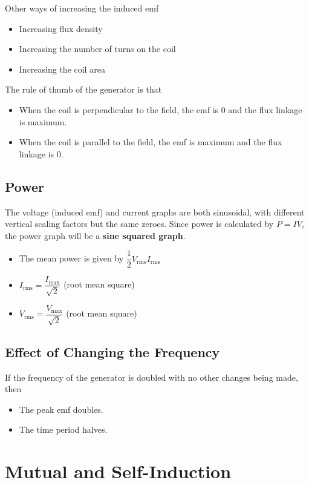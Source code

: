 \documentclass[a4paper,12pt]{article}
\let\oldsection\section
\renewcommand\section{\clearpage\oldsection}
\begin{document}
Other ways of increasing the induced emf
\begin{itemize}
  \item Increasing flux density
  \item Increasing the number of turns on the coil
  \item Increasing the coil area
\end{itemize}

The rule of thumb of the generator is that
\begin{itemize}
  \item When the coil is perpendicular to the field, the emf is 0 and the flux linkage is maximum.
  \item When the coil is parallel to the field, the emf is maximum and the flux linkage is 0.
\end{itemize}

\subsection{Power}

The voltage (induced emf) and current graphs are both sinusoidal, with different vertical scaling factors but the same zeroes. Since power is calculated by $P = IV$, the power graph will be a \textbf{sine squared graph}.
\begin{itemize}
  \item The mean power is given by $\dfrac{1}{2}V_{\text{rms}}I_{\text{rms}}$
  \item $I_{\text{rms}} = \dfrac{I_{\text{max}}}{\sqrt{2}}$ (root mean square)
  \item $V_{\text{rms}} = \dfrac{V_{\text{max}}}{\sqrt{2}}$ (root mean square)
\end{itemize}

\subsection{Effect of Changing the Frequency}

If the frequency of the generator is doubled with no other changes being made, then
\begin{itemize}
  \item The peak emf doubles.
  \item The time period halves.
\end{itemize}

\section{Mutual and Self-Induction}
\end{document}
